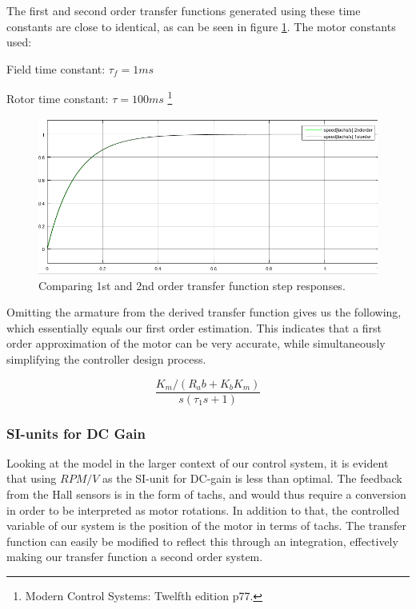 The first and second order transfer functions generated using these time constants are close to identical, as can be seen in figure \ref{fig:1st2ndorderstep}. The motor constants used:

Field time constant: $\tau_f = 1ms$ 

Rotor time constant: $\tau = 100ms$ \footnote{Modern Control Systems: Twelfth edition p77.} 

\begin{figure}[h!]
\centering
\includegraphics[scale=0.6]{Billeder/1st2ndorderstep.png}
\caption{Comparing 1st and 2nd order transfer function step responses.}
\label{fig:1st2ndorderstep}
\end{figure}

Omitting the armature from the derived transfer function gives us the following, which essentially equals our first order estimation. This indicates that a first order approximation of the motor can be very accurate, while simultaneously simplifying the controller design process.

\begin{equation}
\frac{K_m /(R_a b+K_b K_m )}{s(\tau_1 s +1)}
\end{equation}

\subsubsection{SI-units for DC Gain}
Looking at the model in the larger context of our control system, it is evident that using $RPM/V$ as the SI-unit for DC-gain is less than optimal. The feedback from the Hall sensors is in the form of tachs, and would thus require a conversion in order to be interpreted as motor rotations. In addition to that, the controlled variable of our system is the position of the motor in terms of tachs. The transfer function can easily be modified to reflect this through an integration, effectively making our transfer function a second order system.

